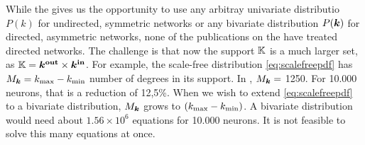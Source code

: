 While the \MFR gives us the opportunity to use any arbitray univariate distributio $P(k)$ for undirected, symmetric networks or any bivariate distribution $P({\boldsymbol{k}})$ for directed, asymmetric networks, none of the publications on the \MFR have treated directed networks. The challenge is that now the support ${\mathbb{K}}$ is a much larger set, as ${\mathbb{K}} = \boldsymbol{{k^{\rm out}}} \times {\boldsymbol{k^{\rm in}}}$. For example, the scale-free distribution \eqref{eq:scalefreepdf} has $M_{{\boldsymbol{k}}} = k_{\text{max}} - k_{\text{min}}$ number of degrees in its support. In \cite{OttAntonsen2017}, $M_{{\boldsymbol{k}}} = $ 1250. For 10.000 neurons, that is a reduction of 12,5\%. When we wish to extend \eqref{eq:scalefreepdf} to a bivariate distribution, $M_{{\boldsymbol{k}}}$ grows to $\left( \kmax - \kmin \right)$. A bivariate distribution would need about $1.56 \times 10^6$ equations for 10.000 neurons. It is not feasible to solve this many equations at once.


